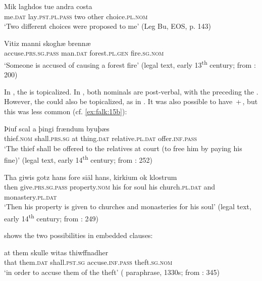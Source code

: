 \documentclass[output=paper]{langscibook}
\begin{document}
\ea%
    \label{ex:falk:14}
\ea \label{ex:falk:14a}
\gll Mik    laghdos        tue  andra  costa\\
      me\textsc{.dat}  lay\textsc{.pst.pl.pass}  two  other    choice\textsc{.pl.nom}\\
\glt ‘Two different choices were proposed to me’ (Leg Bu, EOS, p. 143)

\ex \label{ex:falk:14b}
\gll Vitiz              manni    skoghæ      brennæ\\
      accuse\textsc{.prs.sg.pass}  man\textsc{.dat}  forest.\textsc{pl.gen}  fire.\textsc{sg.nom}\\
\glt ‘Someone is accused of causing a forest fire’ (legal text, early 13\textsuperscript{th} century; from \citealt{Holm1952}: 200)
\z
\z

In , the  is topicalized. In , both nominals are post-verbal, with the  preceding the . However, the  could also be topicalized, as in . It was also possible to have \,+\,, but this was less common (cf. \ref{ex:falk:15b}):

\ea%
    \label{ex:falk:15}
\ea \label{ex:falk:15a}
\gll Þiuf      scal          a  þingi    frændum        byuþæs\\
      thief.\textsc{nom}  shall.\textsc{prs.sg}  at  thing.\textsc{dat}  relative.\textsc{pl}.\textsc{dat}  offer.\textsc{inf.pass}\\
\glt ‘The thief shall be offered to the relatives at court (to free him by paying his fine)’ (legal text, early 14\textsuperscript{th} century; from \citealt{Holm1952}\textsc{:} \textsc{252)}

\ex \label{ex:falk:15b}
\gll Tha  giwis          gotz        hans  fore  siäl  hans,  kirkium ok    klostrum\\
    then  give.\textsc{prs.sg.pass}  property.\textsc{nom}  his    for    soul  his    church.\textsc{pl.dat}   and  monastery.\textsc{pl.dat}\\
\glt ‘Then his property is given to churches and monasteries for his soul’ (legal text, early 14\textsuperscript{th} century; from \citealt{Holm1952}: 249)
\z
\z

          shows the two possibilities in embedded clauses:

\ea%
    \label{ex:falk:16}

\ea
\gll at    them    skulle        witas            thiwffnadher\\
      that  them.\textsc{dat}  shall.\textsc{pst.sg}  accuse.\textsc{inf.pass}    theft.\textsc{sg.nom}\\
\glt ‘in order to accuse them of the theft’ ( paraphrase, 1330s; from \citealt{Holm1952}: 345)
\end{document}
